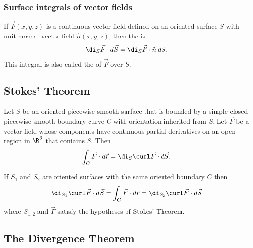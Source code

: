 \documentclass{article}
\begin{document}
\subsubsection{Surface integrals of vector fields}

\begin{definition}
    If $\vec F(x,y,z)$ is a continuous vector field defined on an oriented surface $S$ with
    unit normal vector field $\hat n(x,y,z)$, then the  is
    \begin{align*}
        \di_S \vec F\cdot d\vec S = \di_S \vec F\cdot \hat n\:dS.
    \end{align*}
    This integral is also called the  of $\vec F$ over $S$.
\end{definition}


\subsection{Stokes' Theorem}

\begin{theorem}
    Let $S$ be an oriented piecewise-smooth surface that is bounded by a simple closed
    piecewise smooth boundary curve $C$ with orientation inherited from $S$. Let $\vec F$
    be a vector field whose components have continuous partial derivatives on an open
    region in $\R^3$ that contains $S$. Then
    \begin{align*}
        \int_C \vec F\cdot d\vec r = \di_S \curl \vec F\cdot d\vec S.
    \end{align*} 
\end{theorem}
\begin{corollary}
    If $S_1$ and $S_2$ are oriented surfaces with the same oriented boundary $C$ then
    \begin{align*}
        \di_{S_1}\curl \vec F\cdot d\vec S = \int_C \vec F\cdot d\vec r = \di_{S_2} \curl\vec F\cdot d\vec S
    \end{align*}
    where $S_{1,2}$ and $\vec F$ satisfy the hypotheses of Stokes' Theorem.
\end{corollary}


\subsection{The Divergence Theorem}
\end{document}
